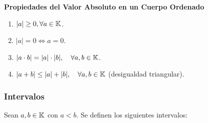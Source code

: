 \textbf{Propiedades del Valor Absoluto en un Cuerpo Ordenado}

\begin{enumerate}
	\item $|a| \geq 0, \forall a \in \mathbb{K}$.
	\item $|a| = 0 \iff a = 0$.
	\item $|a \cdot b| = |a| \cdot |b|, \quad \forall a, b \in \mathbb{K}$.
	\item $|a + b| \leq |a| + |b|, \quad \forall a, b \in \mathbb{K}$ (desigualdad triangular).
\end{enumerate}

\subsubsection{Intervalos}

Sean $a, b \in \mathbb{K}$ con $a < b$. Se definen los siguientes intervalos:

